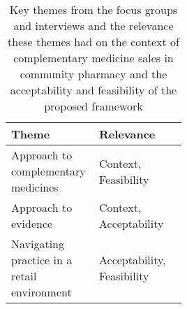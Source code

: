 \begin{table}[tbh]
\centering
\begin{tabular}{p{0.5\linewidth}l}
\hline
\textbf{Theme}                               & \textbf{Relevance}\T\B\\
\hline
Approach to complementary medicines                 & Context, Feasibility       \T\\
Approach to evidence  & Context, Acceptability     \\
Navigating practice in a retail environment  & Acceptability, Feasibility\B\\
\hline
\end{tabular}
\caption{Key themes from the focus groups and interviews and the relevance these themes had on the context of complementary medicine sales in community pharmacy and the acceptability and feasibility of the proposed framework}
\end{table}